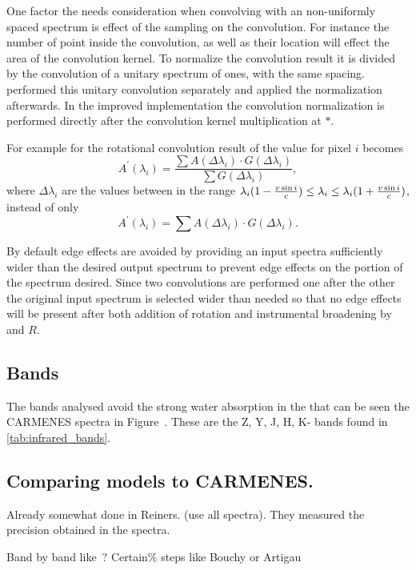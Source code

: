 {One factor the needs consideration when convolving with an non-uniformly spaced spectrum is effect of the sampling on the convolution.
For instance the number of point inside the convolution, as well as their location will effect the area of the convolution kernel.
To normalize the convolution result it is divided by the convolution of a unitary spectrum of ones, with the same spacing.
\citet{figueira_radial_2016} performed this unitary convolution separately and applied the normalization afterwards.
In the improved implementation the convolution normalization is performed directly after the convolution kernel multiplication at \(\textbf{*}\).

For example for the rotational convolution result of the value for pixel $i$ becomes
\[{A}^{\prime}(\lambda_{i}) =  \frac{\sum A(\Delta\lambda_{i}) \cdot G(\Delta\lambda_{i})}{\sum G(\Delta\lambda_{i})},\]
where $\Delta\lambda_{i}$ are the values between in the range $\lambda_{i} (1-\frac{v\sin{i}}{c}) \le\lambda_{i} \le \lambda_{i} (1+ \frac{v\sin{i}}{c})$,
instead of only
\[{A}^{\prime}(\lambda_{i}) = \sum A(\Delta\lambda_{i}) \cdot G(\Delta\lambda_{i}).\]


By default edge effects are avoided by providing an input spectra sufficiently wider than the desired output spectrum to prevent edge effects on the portion of the spectrum desired.
Since two convolutions are performed one after the other the original input spectrum is selected wider than needed so that no edge effects will be present after both addition of rotation and instrumental broadening by \Vsini{} and \(R\).




\subsection{Bands}
The bands analysed avoid the strong water absorption in the \nir{} that can be seen the {CARMENES} spectra in Figure~.
These are the Z, Y, J, H, K- bands found in \cref{tab:infrared_bands}.


\subsection{Comparing models to {CARMENES}.}
Already somewhat done in Reiners.
(use all spectra).
They measured the precision obtained in the spectra.

Band by band like~\citet{figueira_radial_2016}?
Certain\% steps like Bouchy or Artigau


}
